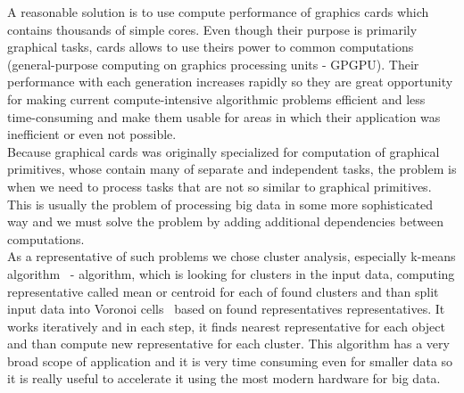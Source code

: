 A reasonable solution is to use compute performance of graphics cards which contains thousands of simple cores. Even though their purpose is primarily graphical tasks, cards allows to use theirs power to common computations (general-purpose computing on graphics processing units - GPGPU). Their performance with each generation increases rapidly so they are great opportunity for making current compute-intensive algorithmic problems efficient and less time-consuming and make them usable for areas in which their application was inefficient or even not possible.\\
Because graphical cards was originally specialized for computation of graphical primitives, whose contain many of separate and independent tasks, the problem is when we need to process tasks that are not so similar to graphical primitives. This is usually the problem of processing big data in some more sophisticated way and we must solve the problem by adding additional dependencies between computations. \\

As a representative of such problems we chose cluster analysis, especially k-means algorithm~\cite{Aggarwal13, EstivillCastro02} - algorithm, which is looking for clusters in the input data, computing representative called mean or centroid for each of found clusters and than split input data into Voronoi cells~\cite{Kim14} based on found representatives representatives. It works iteratively and in each step, it finds nearest representative for each object and than compute new representative for each cluster. This algorithm has a very broad scope of application and it is very time consuming even for smaller data so it is really useful to accelerate it using the most modern hardware for big data.\\

